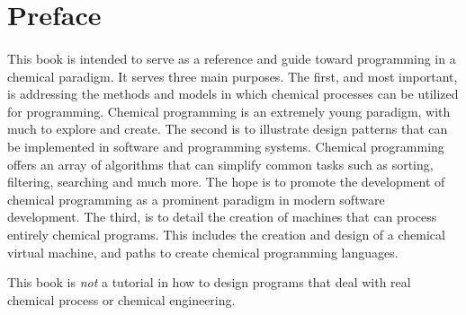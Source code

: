 
\section{Preface}
\paragraph{   } This book is intended to serve as a reference and guide toward programming in a chemical paradigm.  It serves three main purposes. The first, and most important, is addressing the methods and models in which chemical processes can be utilized for programming. Chemical programming is an extremely young paradigm, with much to explore and create. The second is to illustrate design patterns that can be implemented in software and programming systems. Chemical programming offers an array of algorithms that can simplify common tasks such as sorting, filtering, searching and much more. The hope is to promote the development of chemical programming as a prominent paradigm in modern software development.  The third, is to detail the creation of machines that can process entirely chemical programs. This includes the creation and design of a chemical virtual machine, and paths to create  chemical programming languages.
\par This book is \textit{not} a tutorial in how to design programs that deal with real chemical process or chemical engineering.

\newpage